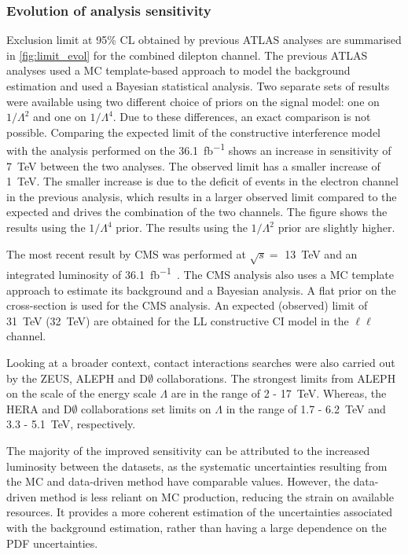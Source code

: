 \subsubsection{Evolution of analysis sensitivity}\label{sec:results:evol}
Exclusion limit at 95\% CL obtained by previous ATLAS analyses are summarised in \cref{fig:limit_evol} for the combined dilepton channel. The previous ATLAS analyses used a MC template-based approach to model the background estimation and used a Bayesian statistical analysis. Two separate sets of results were available using two different choice of priors on the signal model: one on $1/\Lambda^2$ and one on $1/\Lambda^4$. Due to these differences, an exact comparison is not possible. Comparing the expected limit of the constructive interference model with the analysis performed on the \SI{36.1}{\femto\barn^{-1}} shows an increase in sensitivity of \SI{7}{\tera\electronvolt} between the two analyses. The observed limit has a smaller increase of \SI{1}{\tera\electronvolt}. The smaller increase is due to the deficit of events in the electron channel in the previous analysis, which results in a larger observed limit compared to the expected and drives the combination of the two channels. The figure shows the results using the $1/\Lambda^4$ prior. The results using the $1/\Lambda^2$ prior are slightly higher.

The most recent result by CMS was performed at $\sqrt{s} = $ \SI{13}{\tera\electronvolt} and an integrated luminosity of \SI{36.1}{\femto\barn^{-1}}~\cite{Sirunyan:2018ipj}. The CMS analysis also uses a MC template approach to estimate its background and a Bayesian analysis. A flat prior on the cross-section is used for the CMS analysis. An expected (observed) limit of \SI{31}{\tera\electronvolt} (\SI{32}{\tera\electronvolt}) are obtained for the LL constructive CI model in the $\ell\ell$ channel. 

Looking at a broader context, contact interactions searches were also carried out by the ZEUS, ALEPH and $\mathrm{D}\emptyset$ collaborations. The strongest limits from ALEPH on the scale of the energy scale $\Lambda$ are in the range of 2 - \SI{17}{\tera\electronvolt}. Whereas, the HERA and $\mathrm{D}\emptyset$ collaborations set limits on $\Lambda$ in the range of 1.7 - \SI{6.2}{\tera\electronvolt} and 3.3 - \SI{5.1}{\tera\electronvolt}, respectively. 

The majority of the improved sensitivity can be attributed to the increased luminosity between the datasets, as the systematic uncertainties resulting from the MC and data-driven method have comparable values. However, the data-driven method is less reliant on MC production, reducing the strain on available resources. It provides a more coherent estimation of the uncertainties associated with the background estimation, rather than having a large dependence on the PDF uncertainties. 


